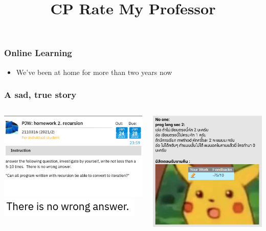 \documentclass[aspectratio=169]{beamer}
\title{CP Rate My Professor}
\begin{document}
\frame{\titlepage}
\begin{frame}
    \frametitle{Online Learning}
    \begin{itemize}
        \item We've been at home for more than two years now
    \end{itemize}
\end{frame}
\begin{frame}

\end{frame}
\begin{frame}
    \frametitle{A sad, true story}
    \pause
    \begin{columns}
        \begin{column}{0.4\textwidth}
            \centering
            \includegraphics[scale=0.3]{proglangsec1}
            \includegraphics[scale=0.5]{proglangsec1_nowrong}
        \end{column}
        \pause
        \begin{column}{0.4\textwidth}
            \centering
            \includegraphics[scale=0.2]{proglangsec2}

\end{column}
\end{columns}
\end{frame}
\end{document}
